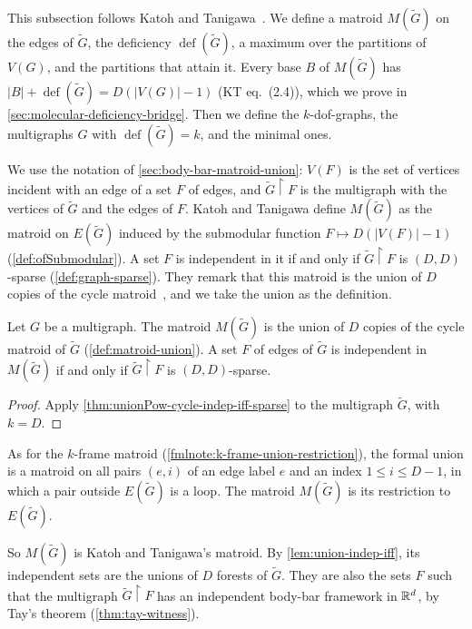 This subsection follows Katoh and
Tanigawa~\cite[\S2.5 and the start of \S3]{katohTanigawa2011}. We define
a matroid $M(\tilde G)$ on the edges of $\tilde G$, the deficiency
$\operatorname{def}(\tilde G)$, a maximum over the partitions of
$V(G)$, and the partitions that attain it. Every base $B$ of
$M(\tilde G)$ has
$|B| + \operatorname{def}(\tilde G) = D(|V(G)| - 1)$ (KT eq.~(2.4)),
which we prove in \cref{sec:molecular-deficiency-bridge}. Then we
define the $k$-dof-graphs, the multigraphs $G$ with
$\operatorname{def}(\tilde G) = k$, and the minimal ones.

We use the notation of \cref{sec:body-bar-matroid-union}: $V(F)$ is
the set of vertices incident with an edge of a set $F$ of edges, and
$\tilde G \restriction F$ is the multigraph with the vertices of
$\tilde G$ and the edges of $F$. Katoh and Tanigawa define $M(\tilde G)$
as the matroid on $E(\tilde G)$ induced by the submodular function
$F \mapsto D(|V(F)| - 1)$ (\cref{def:ofSubmodular}). A set $F$ is
independent in it if and only if $\tilde G \restriction F$ is
$(D, D)$-sparse (\cref{def:graph-sparse}). They remark that this
matroid is the union of $D$ copies of the cycle
matroid~\cite[p.~655]{katohTanigawa2011}, and we take the union as the
definition.

\begin{definition}
  \label{def:matroid-MG}
  \leanok
  Let $G$ be a multigraph. The matroid $M(\tilde G)$ is the union of
  $D$ copies of the cycle matroid of $\tilde G$
  (\cref{def:matroid-union}). A set $F$ of edges of $\tilde G$ is
  independent in $M(\tilde G)$ if and only if
  $\tilde G \restriction F$ is $(D, D)$-sparse.
\end{definition}
\begin{proof}
  \leanok
  Apply \cref{thm:unionPow-cycle-indep-iff-sparse} to the multigraph
  $\tilde G$, with $k = D$.
\end{proof}
\begin{fmlnote}
  As for the $k$-frame matroid
  (\cref{fmlnote:k-frame-union-restriction}), the formal union is a
  matroid on all pairs $(e, i)$ of an edge label $e$ and an index
  $1 \le i \le D - 1$, in which a pair outside $E(\tilde G)$ is a loop.
  The matroid $M(\tilde G)$ is its restriction to $E(\tilde G)$.
\end{fmlnote}

So $M(\tilde G)$ is Katoh and Tanigawa's matroid. By
\cref{lem:union-indep-iff}, its independent sets are the unions of $D$
forests of $\tilde G$. They are also the sets $F$ such that the
multigraph $\tilde G \restriction F$ has an independent body-bar
framework in ${\mathbb{R}}^d$, by Tay's theorem (\cref{thm:tay-witness}).

